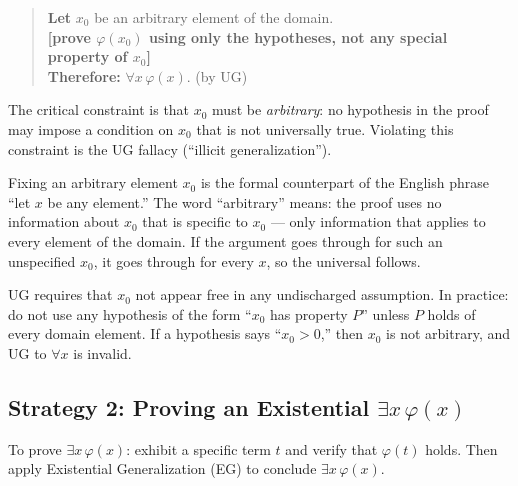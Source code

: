 \begin{quote}
\textbf{Let} $x_0$ be an arbitrary element of the domain.\\
\textbf{[prove $\varphi(x_0)$ using only the hypotheses, not any special property of $x_0$]}\\
\textbf{Therefore:} $\forall x\,\varphi(x)$. \quad (by UG)
\end{quote}

\begin{exposition}
The critical constraint is that $x_0$ must be \emph{arbitrary}: no hypothesis
in the proof may impose a condition on $x_0$ that is not universally true.
Violating this constraint is the UG fallacy (``illicit generalization'').
\end{exposition}

\begin{remark*}
Fixing an arbitrary element $x_0$ is the formal counterpart of the English
phrase ``let $x$ be any element.'' The word ``arbitrary'' means: the proof
uses no information about $x_0$ that is specific to $x_0$ --- only information
that applies to every element of the domain. If the argument goes through for
such an unspecified $x_0$, it goes through for every $x$, so the universal
follows.
\end{remark*}

\begin{remark*}
UG requires that $x_0$ not appear free in any undischarged assumption. In
practice: do not use any hypothesis of the form ``$x_0$ has property $P$''
unless $P$ holds of every domain element. If a hypothesis says ``$x_0 > 0$,''
then $x_0$ is not arbitrary, and UG to $\forall x$ is invalid.
\end{remark*}


\subsection*{\texorpdfstring{Strategy 2: Proving an Existential $\exists x\,\varphi(x)$}{Strategy 2: Proving an Existential exists x phi(x)}}

\begin{exposition}
To prove $\exists x\,\varphi(x)$: exhibit a specific term $t$ and verify that
$\varphi(t)$ holds. Then apply Existential Generalization (EG) to conclude
$\exists x\,\varphi(x)$.
\end{exposition}


